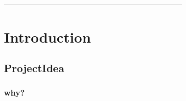  ------------------------------------------------------------------------------
\chapter{Introduction} %
\section{ProjectIdea} %
\subsection{why?} %

